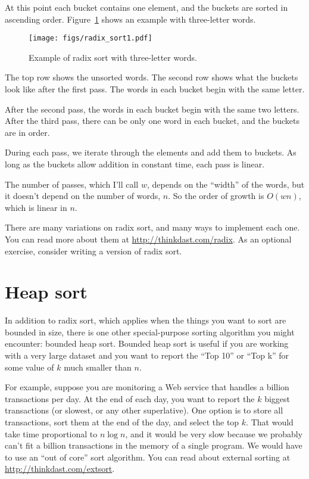 \documentclass[12pt]{book}
\theoremstyle{exercise}
\begin{document}
At this point each bucket contains one element, and the buckets are
sorted in ascending order. Figure~\ref{fig-sort3}
shows an example with
three-letter words.

\begin{figure}
\centering
\texttt{[image: figs/radix\_sort1.pdf]}
\caption{Example of radix sort with three-letter words.}
\label{fig-sort3}
\end{figure}

The top row shows the unsorted words. The second row shows what the
buckets look like after the first pass. The words in each bucket begin
with the same letter.

After the second pass, the words in each bucket begin with the same two
letters. After the third pass, there can be only one word in each
bucket, and the buckets are in order.

During each pass, we iterate through the elements and add them to
buckets. As long as the buckets allow addition in constant time, each
pass is linear.


The number of passes, which I'll call $w$, depends on the ``width''
of the words, but it doesn't depend on the number of words, $n$.
So the order of growth is $O(wn)$, which is linear in $n$.

There are many variations on radix sort, and many ways to implement
each one. You can read more about them at
\url{http://thinkdast.com/radix}. As an optional
exercise, consider writing a version of radix sort.


\section{Heap sort}
\label{heap-sort}


In addition to radix sort, which applies when the things you want to
sort are bounded in size, there is one other special-purpose sorting
algorithm you might encounter: bounded heap sort. Bounded heap sort is
useful if you are working with a very large dataset and you want to
report the ``Top 10'' or ``Top k'' for some value of $k$ much
smaller than $n$.

For example, suppose you are monitoring a Web service that handles a
billion transactions per day. At the end of each day, you want to
report the $k$ biggest transactions (or slowest, or any other
superlative). One option is to store all transactions, sort them at
the end of the day, and select the top $k$. That would take time
proportional to $n \log n$, and it would be very slow because we
probably can't fit a billion transactions in the memory of a single
program. We would have to use an ``out of core'' sort algorithm. You
can read about external sorting at \url{http://thinkdast.com/extsort}.
\end{document}
